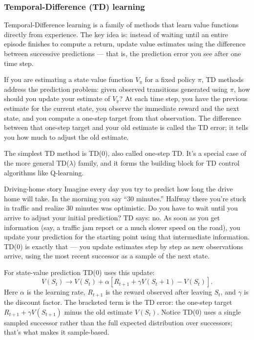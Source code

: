 \subsubsection{Temporal-Difference (TD) learning}
Temporal-Difference learning is a family of methods that learn value functions directly from experience. The key idea is: instead of waiting until an entire episode finishes to compute a return, update value estimates using the difference between successive predictions — that is, the prediction error you see after one time step.

If you are estimating a state value function $V_\pi$ for a fixed policy $\pi$, TD methods address the prediction problem: given observed transitions generated using $\pi$, how should you update your estimate of $V_\pi$? At each time step, you have the previous estimate for the current state, you observe the immediate reward and the next state, and you compute a one-step target from that observation. The difference between that one-step target and your old estimate is called the TD error; it tells you how much to adjust the old estimate.

The simplest TD method is TD(0), also called one-step TD. It’s a special case of the more general TD($\lambda$) family, and it forms the building block for TD control algorithms like Q-learning.

\begin{Example}{Driving-home story}{}
    Imagine every day you try to predict how long the drive home will take. In the morning you say “30 minutes.” Halfway there you’re stuck in traffic and realize 30 minutes was optimistic. Do you have to wait until you arrive to adjust your initial prediction? TD says: no. As soon as you get information (say, a traffic jam report or a much slower speed on the road), you update your prediction for the starting point using that intermediate information. TD(0) is exactly that — you update estimates step by step as new observations arrive, using the most recent successor as a sample of the next state.
\end{Example}

For state-value prediction TD(0) uses this update:
\begin{equation*}
    V(S_t)\rightarrow V(S_t)+\alpha[R_{t+1}+\gamma V(S_t+1) - V(S_t)].
\end{equation*}
Here $\alpha$ is the learning rate, $R_{t+1}$ is the reward observed after leaving $S_t$, and $\gamma$ is the discount factor. The bracketed term is the TD error: the one-step target $R_{t+1}+\gamma V(S_{t+1})$ minus the old estimate $V(S_t)$. Notice TD(0) uses a single sampled successor rather than the full expected distribution over successors; that’s what makes it sample-based.

